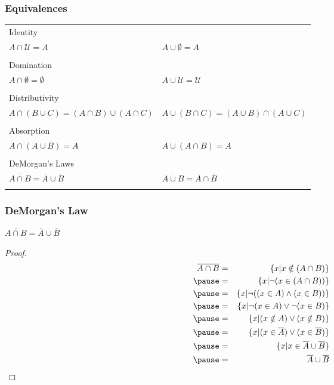 \documentclass[dvipsnames]{beamer}
\begin{document}
\begin{frame}
  \frametitle{Equivalences}

  \begin{tabular}{ll}
    \alert{Identity} &\\
      $A \cap \mathcal{U} = A$ &
      $A \cup \emptyset = A$\\\\
    \pause
    \alert{Domination} &\\
      $A \cap \emptyset = \emptyset$ &
      $A \cup \mathcal{U} = \mathcal{U}$\\\\
    \pause
    \alert{Distributivity} &\\
      $A \cap (B \cup C) = (A \cap B) \cup (A \cap C)$ &
      $A \cup (B \cap C) = (A \cup B) \cap (A \cup C)$\\\\
    \pause
    \alert{Absorption} &\\
      $A \cap (A \cup B) = A$ &
      $A \cup (A \cap B) = A$\\\\
    \pause
    \alert{DeMorgan's Laws} &\\
      $\overline{A \cap B} = \overline{A} \cup \overline{B}$ &
      $\overline{A \cup B} = \overline{A} \cap \overline{B}$\\\\
  \end{tabular}
\end{frame}

\begin{frame}
  \frametitle{DeMorgan's Law}

  \begin{theorem}
    $\overline{A \cap B} = \overline{A} \cup \overline{B}$
  \end{theorem}

  \pause
  \begin{proof}
    \vspace{-2em}
    \begin{eqnarray*}
      \overline{A \cap B} & = & \{x | x \notin (A \cap B)\}\\\pause
                          & = & \{x | \neg (x \in (A \cap B))\}\\\pause
                          & = & \{x | \neg ((x \in A) \wedge (x \in B))\}\\\pause
                          & = & \{x | \neg (x \in A) \vee \neg (x \in B)\}\\\pause
                          & = & \{x | (x \notin A) \vee (x \notin B)\}\\\pause
                          & = & \{x | (x \in \overline{A}) \vee (x \in \overline{B})\}\\\pause
                          & = & \{x | x \in \overline{A} \cup \overline{B}\}\\\pause
                          & = & \overline{A} \cup \overline{B}
    \end{eqnarray*}
  \end{proof}
\end{frame}
\end{document}

